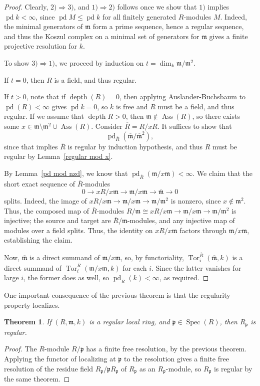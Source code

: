 \documentclass[11pt]{book}
\newtheorem{theorem}{Theorem}[chapter]
\numberwithin{equation}{section}
\numberwithin{theorem}{chapter}
\theoremstyle{definition}
\newtheorem*{basic properties}{Basic Properties}
\newtheorem*{Important Remark}{Important Remark}
\theoremstyle{remark}
\newcommand{\m}{\mathfrak{m}}
\newcommand{\p}{\mathfrak{p}}
\newcommand{\Spec}{\operatorname{Spec}}
\newcommand{\Tor}{\operatorname{Tor}}
\newcommand{\Ass}{\operatorname{Ass}}
\renewcommand{\dim}{\operatorname{dim}}
\newcommand{\depth}{\operatorname{depth}}
\newcommand{\pd}{\operatorname{pd}}
\begin{document}
\begin{proof}
	Clearly, $2) \Rightarrow 3)$, and $1) \Rightarrow 2)$ follows once we show that $1)$ implies $\pd k < \infty$, since $\pd M \leqslant \pd k$ for all finitely generated $R$-modules $M$. Indeed, the minimal generators of $\m$ form a prime sequence, hence a regular sequence, and thus the Koszul complex on a minimal set of generators for $\m$ gives a finite projective resolution for $k$.
	
	To show $3) \Rightarrow 1)$, we proceed by induction on $t = \dim_k \m / \m^2$.
	
	If $t=0$, then $R$ is a field, and thus regular.
	
	If $t>0$, note that if $\depth(R) = 0$, then applying Auslander-Buchsbaum to $\pd (R)< \infty$ gives $\pd k = 0$, so $k$ is free and $R$ must be a field, and thus regular. If we assume that $\depth R > 0$, then $\m \notin \Ass(R)$, so there exists some $x \in \m \setminus \m^2 \cup \Ass (R)$. Consider $\overline{R} = R/xR$. It suffices to show that
	$$\pd_{\overline{R}} (\overline{\m}/\overline{\m}^2),$$
	since that implies $\overline{R}$ is regular by induction hypothesis, and thus $R$ must be regular by Lemma~\ref{regular mod x}.
	
	By Lemma~\ref{pd mod nzd}, we know that $\pd_{\overline{R}}(\m/x\m)<\infty$. We claim that the short exact sequence of $\overline{R}$-modules
	\[ 0 \to xR/x\m \to \m/x\m \to \overline{\m} \to 0\]
	splits. Indeed, the image of $xR/x\m \to \m / x\m \to \m/\m^2$ is nonzero, since $x\notin \m^2$. Thus, the composed map of $\overline{R}$-modules $R/\m\cong xR/x\m \to \m / x\m \to \m/\m^2$ is injective; the source and target are $\overline{R}/\m$-modules, and any injective map of modules over a field splits. Thus, the identity on $xR/x\m$ factors through $\m/x\m$, establishing the claim.
	
	Now, $\overline{\m}$ is a direct summand of $\m/x\m$, so, by functoriality, $\Tor^{\overline{R}}_i(\overline{\m},k)$ is a direct summand of $\Tor^{\overline{R}}_i(\m/x\m,k)$ for each $i$. Since the latter vanishes for large $i$, the former does as well, so $\pd_{\overline{R}}(k)<\infty$, as required. 
\end{proof}

One important consequence of the previous theorem is that the regularity property localizes.

\begin{theorem}
	If $(R,\m,k)$ is a regular local ring, and $\p\in \Spec(R)$, then $R_\p$ is regular.
\end{theorem}
\begin{proof}
	The $R$-module $R/\p$ has a finite free resolution, by the previous theorem. Applying the functor of localizing at $\p$ to the resolution gives a finite free resolution of the residue field $R_{\p}/\p R_{\p}$ of $R_{\p}$ as an $R_{\p}$-module, so $R_{\p}$ is regular by the same theorem. 
\end{proof}
\end{document}
